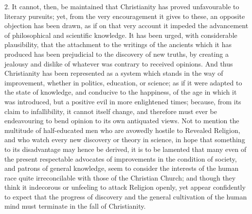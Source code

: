 2. It cannot, then, be maintained that Christianity has proved
unfavourable to literary pursuits; yet, from the very encouragement it
gives to these, an opposite objection has been drawn, as if on that
very account it impeded the advancement of philosophical and
scientific knowledge. It has been urged, with considerable
plausibility, that the attachment to the writings of the ancients
which it has produced has been prejudicial to the discovery of new
truths, by creating a jealousy and dislike of whatever was contrary to
received opinions. And thus Christianity has been represented as a
system which stands in the way of improvement, whether in politics,
education, or science; as if it were adapted to the state of
knowledge, and conducive to the happiness, of the age in which it was
introduced, but a positive evil in more enlightened times; because,
from its claim to infallibility, it cannot itself change, and
therefore must ever be endeavouring to bend opinion to its own
antiquated views. Not to mention the multitude of half-educated men
who are avowedly hostile to Revealed Religion, and who watch every new
discovery or theory in science, in hope that something to its
disadvantage may hence be derived, it is to be lamented that many even
of the present respectable advocates of improvements in the condition
of society, and patrons of general knowledge, seem to consider the
interests of the human race quite irreconcilable with those of the
Christian Church; and though they think it indecorous or unfeeling to
attack Religion openly, yet appear confidently to expect that the
progress of discovery and the general cultivation of the human mind
must terminate in the fall of Christianity.

